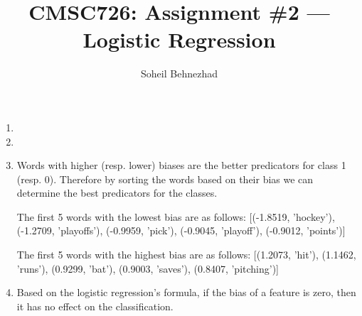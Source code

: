 \documentclass[letterpaper,11pt]{article}
\author{Soheil Behnezhad}
\title{CMSC726: Assignment \#2 --- Logistic Regression}
\begin{document}
\maketitle

\begin{enumerate}
\item
\item
\item Words with higher (resp. lower) biases are the better predicators for class 1 (resp. 0). Therefore by sorting the words based on their bias we can determine the best predicators for the classes.

The first 5 words with the lowest bias are as follows:
[(-1.8519, 'hockey'), (-1.2709, 'playoffs'), (-0.9959, 'pick'), (-0.9045, 'playoff'), (-0.9012, 'points')]

The first 5 words with the highest bias are as follows:
[(1.2073, 'hit'), (1.1462, 'runs'), (0.9299, 'bat'), (0.9003, 'saves'), (0.8407, 'pitching')]
\item Based on the logistic regression's formula, if the bias of a feature is zero, then it has no effect on the classification. 
\end{enumerate}
\end{document}
